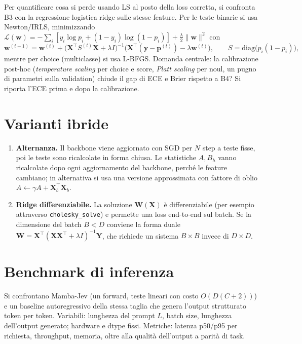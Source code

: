 \documentclass[11pt,a4paper]{article}
\newcommand{\X}{\bm{X}}
\newcommand{\W}{\bm{W}}
\newcommand{\Y}{\bm{Y}}
\begin{document}
Per quantificare cosa si perde usando LS al posto della loss corretta, si confronta B3 con la regressione logistica ridge sulle stesse feature. Per le teste binarie si usa Newton/IRLS, minimizzando
$\mathcal{L}(\bm w)=-\sum_i[y_i\log p_i+(1-y_i)\log(1-p_i)]+\tfrac{\lambda}{2}\|\bm w\|^2$ con
\begin{equation}
  \bm w^{(t+1)}=\bm w^{(t)}+\big(\X^\top S^{(t)}\X+\lambda I\big)^{-1}\big(\X^\top(\bm y-\bm p^{(t)})-\lambda\bm w^{(t)}\big),
  \qquad S=\mathrm{diag}\big(p_i(1-p_i)\big),
\end{equation}
mentre per choice (multiclasse) si usa L-BFGS. Domanda centrale: la calibrazione post-hoc (\emph{temperature scaling} per choice e score, \emph{Platt scaling} per noul, un pugno di parametri sulla validation) chiude il gap di ECE e Brier rispetto a B4? Si riporta l'ECE prima e dopo la calibrazione.

\section{Varianti ibride}

\begin{enumerate}[label=(\roman*)]
  \item \textbf{Alternanza.} Il backbone viene aggiornato con SGD per $N$ step a teste fisse, poi le teste sono ricalcolate in forma chiusa. Le statistiche $A,B_h$ vanno ricalcolate dopo ogni aggiornamento del backbone, perché le feature cambiano; in alternativa si usa una versione approssimata con fattore di oblio $A\leftarrow\gamma A+\X_b^\top\X_b$.
  \item \textbf{Ridge differenziabile.} La soluzione $\W(\X)$ è differenziabile (per esempio attraverso \texttt{cholesky\_solve}) e permette una loss end-to-end sul batch. Se la dimensione del batch $B<D$ conviene la forma duale $\W=\X^\top(\X\X^\top+\lambda I)^{-1}\Y$, che richiede un sistema $B\times B$ invece di $D\times D$.
\end{enumerate}

\section{Benchmark di inferenza}

Si confrontano Mamba-Jev (un forward, teste lineari con costo $O(D(C+2))$) e un baseline autoregressivo della stessa taglia che genera l'output strutturato token per token. Variabili: lunghezza del prompt $L$, batch size, lunghezza dell'output generato; hardware e dtype fissi. Metriche: latenza p50/p95 per richiesta, throughput, memoria, oltre alla qualità dell'output a parità di task.
\end{document}

